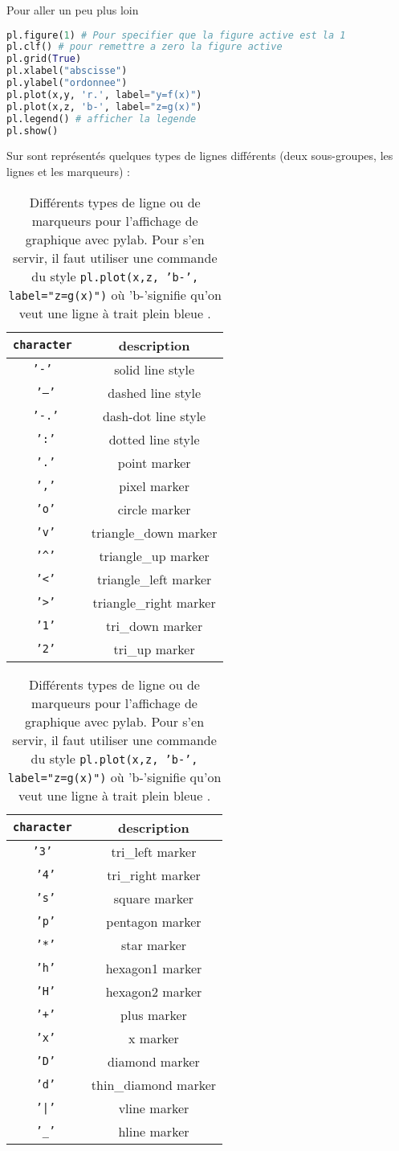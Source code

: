 \documentclass[a4paper,twoside]{article}
\begin{document}
Pour aller un peu plus loin
\begin{lstlisting}[language=python]
pl.figure(1) # Pour specifier que la figure active est la 1
pl.clf() # pour remettre a zero la figure active
pl.grid(True)
pl.xlabel("abscisse")
pl.ylabel("ordonnee")
pl.plot(x,y, 'r.', label="y=f(x)")
pl.plot(x,z, 'b-', label="z=g(x)")
pl.legend() # afficher la legende
pl.show()
\end{lstlisting}

Sur  sont représentés quelques types de lignes différents (deux sous-groupes, les lignes et les marqueurs) : 
\begin{table}[htb]
\hfill
\begin{tabular}{|>{\tt}c<{}|c|}
\hline
character & description\\\hline
'-' & solid line style\\\hline
'--' & dashed line style\\\hline
'-.' & dash-dot line style\\\hline
':' & dotted line style\\\hline
'.' & point marker\\\hline
',' & pixel marker\\\hline
'o' & circle marker\\\hline
'v' & triangle\_down marker\\\hline
'\textasciicircum' & triangle\_up marker\\\hline
'<' & triangle\_left marker\\\hline
'>' & triangle\_right marker\\\hline
'1' & tri\_down marker\\\hline
'2' & tri\_up marker\\\hline
\end{tabular}
\hfill
\begin{tabular}{|>{\tt}c<{}|c|}
\hline
character & description\\\hline
'3' & tri\_left marker\\\hline
'4' & tri\_right marker\\\hline
's' & square marker\\\hline
'p' & pentagon marker\\\hline
'*' & star marker\\\hline
'h' & hexagon1 marker\\\hline
'H' & hexagon2 marker\\\hline
'+' & plus marker\\\hline
'x' & x marker\\\hline
'D' & diamond marker\\\hline
'd' & thin\_diamond marker\\\hline
'|' & vline marker\\\hline
'\_' & hline marker\\\hline
\end{tabular}\hfill~

\caption{Différents types de ligne ou de marqueurs pour l'affichage de graphique avec pylab. Pour s'en servir, il faut utiliser une commande du style \texttt{pl.plot(x,z, 'b-', label="z=g(x)")} où \og 'b-'\fg signifie qu'on veut une ligne à trait plein bleue .}\label{tab:type_ligne}
\end{table}
\end{document}
